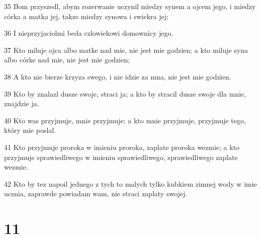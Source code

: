 \par 35 Bom przyszedl, abym rozerwanie uczynil miedzy synem a ojcem jego, i miedzy córka a matka jej, takze miedzy synowa i swiekra jej;
\par 36 I nieprzyjaciolmi beda czlowiekowi domownicy jego.
\par 37 Kto miluje ojca albo matke nad mie, nie jest mie godzien; a kto miluje syna albo córke nad mie, nie jest mie godzien;
\par 38 A kto nie bierze krzyza swego, i nie idzie za mna, nie jest mie godzien.
\par 39 Kto by znalazl dusze swoje, straci ja; a kto by stracil dusze swoje dla mnie, znajdzie ja.
\par 40 Kto was przyjmuje, mnie przyjmuje; a kto mnie przyjmuje, przyjmuje tego, który mie poslal.
\par 41 Kto przyjmuje proroka w imieniu proroka, zaplate proroka wezmie; a kto przyjmuje sprawiedliwego w imieniu sprawiedliwego, sprawiedliwego zaplate wezmie.
\par 42 Kto by tez napoil jednego z tych to malych tylko kubkiem zimnej wody w imie ucznia, zaprawde powiadam wam, nie straci zaplaty swojej.

\chapter{11}

